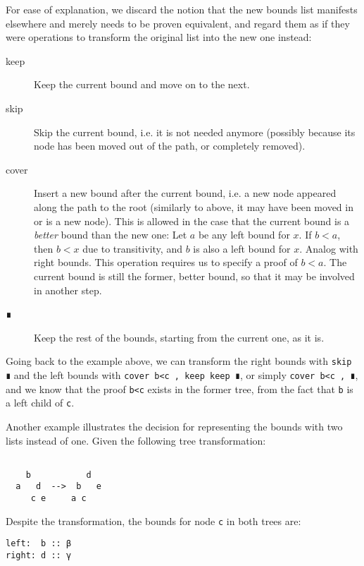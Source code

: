 \documentclass{scrartcl}
\begin{document}
For ease of explanation, we discard the notion that the new bounds
list manifests elsewhere and merely needs to be proven equivalent, and
regard them as if they were operations to transform the original list
into the new one instead:

\begin{description}
\item[keep] Keep the current bound and move on to the next.
\item[skip] Skip the current bound, i.e. it is not needed anymore
  (possibly because its node has been moved out of the path, or
  completely removed).
\item[cover] Insert a new bound after the current bound, i.e. a new
  node appeared along the path to the root (similarly to above, it may
  have been moved in or is a new node). This is allowed in the case
  that the current bound is a \emph{better} bound than the new one:
  Let $a$ be any left bound for $x$. If $b<a$, then $b<x$ due to
  transitivity, and $b$ is also a left bound for $x$. Analog with
  right bounds. This operation requires us to specify a proof of
  $b<a$. The current bound is still the former, better bound, so that
  it may be involved in another step.
\item[∎] Keep the rest of the bounds, starting from the current one,
  as it is.
\end{description}

Going back to the example above, we can transform the right bounds
with \verb/skip ∎/ and the left bounds with
\verb/cover b<c , keep keep ∎/, or simply \verb/cover b<c , ∎/, and we
know that the proof \verb/b<c/ exists in the former tree, from the fact
that \verb/b/ is a left child of \verb/c/.

\pagebreak

Another example illustrates the decision for representing the bounds
with two lists instead of one. Given the following tree
transformation:

\begin{verbatim}

    b           d
  a   d  -->  b   e
     c e     a c

\end{verbatim}

Despite the transformation, the bounds for node \verb/c/ in both trees are:

\begin{verbatim}
left:  b :: β
right: d :: γ
\end{verbatim}
\end{document}
